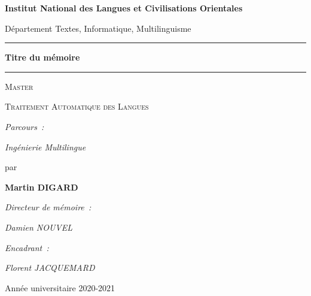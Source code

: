 \begin{center}
{\Large \textbf{Institut National des Langues et Civilisations Orientales}}


{\normalsize Département Textes, Informatique, Multilinguisme}

\hrule
{}
{\LARGE \textbf{Titre du mémoire}}
\hrule


{\Huge \textsc{Master}}


{\LARGE \textsc{Traitement Automatique des Langues}}


{\normalsize \emph{Parcours~:}}


{\normalsize \emph{Ingénierie Multilingue}}


{\large par}


\textbf{{\LARGE Martin \textsc{DIGARD}}}


{\normalsize \emph{Directeur de mémoire~:}}


{\normalsize \emph{Damien NOUVEL}}


{\normalsize \emph{Encadrant~:}}


{\normalsize \emph{Florent JACQUEMARD}}


{\normalsize Année universitaire 2020-2021}

\end{center}

\cleardoublepage %
